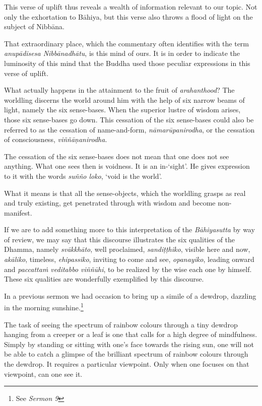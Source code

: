 This verse of uplift thus reveals a wealth of information relevant to our topic. Not only the exhortation to Bāhiya, but this verse also throws a flood of light on the subject of Nibbāna.

That extraordinary place, which the commentary often identifies with the term \emph{anupādisesa Nibbānadhātu}, is this mind of ours. It is in order to indicate the luminosity of this mind that the Buddha used those peculiar expressions in this verse of uplift.

What actually happens in the attainment to the fruit of \emph{arahanthood}? The worldling discerns the world around him with the help of six narrow beams of light, namely the six sense-bases. When the superior lustre of wisdom arises, those six sense-bases go down. This cessation of the six sense-bases could also be referred to as the cessation of name-and-form, \emph{nāmarūpanirodha}, or the cessation of consciousness, \emph{viññāṇanirodha}.

The cessation of the six sense-bases does not mean that one does not see anything. What one sees then is voidness. It is an in-`sight'. He gives expression to it with the words \emph{suñño loko}, `void is the world'.

What it means is that all the sense-objects, which the worldling grasps as real and truly existing, get penetrated through with wisdom and become non-manifest.

If we are to add something more to this interpretation of the \emph{Bāhiyasutta} by way of review, we may say that this discourse illustrates the six qualities of the Dhamma, namely \emph{svākkhāto}, well proclaimed, \emph{sandiṭṭhiko}, visible here and now, \emph{akāliko}, timeless, \emph{ehipassiko}, inviting to come and see, \emph{opanayiko}, leading onward and \emph{paccattaṁ veditabbo viññūhi}, to be realized by the wise each one by himself. These six qualities are wonderfully exemplified by this discourse.

In a previous sermon we had occasion to bring up a simile of a dewdrop, dazzling in the morning sunshine.\footnote{See \emph{Sermon 9}}

The task of seeing the spectrum of rainbow colours through a tiny dewdrop hanging from a creeper or a leaf is one that calls for a high degree of mindfulness. Simply by standing or sitting with one's face towards the rising sun, one will not be able to catch a glimpse of the brilliant spectrum of rainbow colours through the dewdrop. It requires a particular viewpoint. Only when one focuses on that viewpoint, can one see it.

